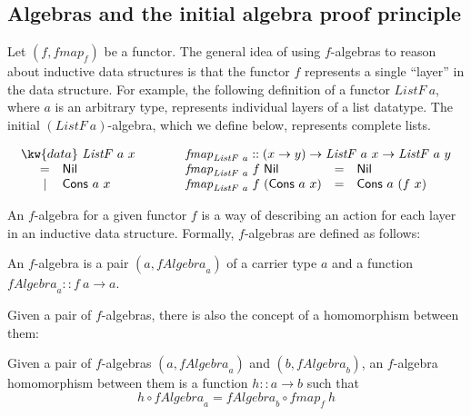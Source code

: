 \subsection{Algebras and the initial algebra proof principle}
\label{sec:f-algebras-detail}

Let $(f, \mathit{fmap}_f)$ be a functor. The general idea of using
$f$-algebras to reason about inductive data structures is that the
functor $f$ represents a single ``layer'' in the data structure. For
example, the following definition of a functor $\mathit{ListF}~a$,
where $a$ is an arbitrary type, represents individual layers of a list
datatype. The initial $(\mathit{ListF}~a)$-algebra, which we define
below, represents complete lists.

\begin{displaymath}
  \begin{array}{l@{\hspace{3em}}l}
    \begin{array}{l}
      \kw{data}~\mathit{ListF}~a~x \\
      \quad
      \begin{array}{cl}
        = & \mathsf{Nil} \\
        | & \mathsf{Cons}~a~x
      \end{array}
    \end{array}
    &
    \begin{array}{l}
      \mathit{fmap}_{\mathit{ListF}~a} :: (x \to y) \to \mathit{ListF}~a~x \to \mathit{ListF}~a~y \\
      \begin{array}{@{}l@{\hspace{0.3em}}l@{\hspace{0.3em}}lcl}
      \mathit{fmap}_{\mathit{ListF}~a}&f&\mathsf{Nil} &=& \mathsf{Nil} \\
      \mathit{fmap}_{\mathit{ListF}~a}&f&(\mathsf{Cons}~a~x) &=& \mathsf{Cons}~a~(f~x)
    \end{array}
    \end{array}
  \end{array}
\end{displaymath}

An $f$-algebra for a given functor $f$ is a way of describing an
action for each layer in an inductive data structure. Formally,
$f$-algebras are defined as follows:
\begin{definition}
  An $f$-algebra is a pair $(a, \mathit{fAlgebra}_a)$ of a carrier
  type $a$ and a function $\mathit{fAlgebra}_a :: f~a \to a$.
\end{definition}
Given a pair of $f$-algebras, there is also the concept of a
homomorphism between them:
\begin{definition}
  Given a pair of $f$-algebras $(a,\mathit{fAlgebra}_a)$ and $(b,
  \mathit{fAlgebra}_b)$, an $f$-algebra homomorphism between them is a
  function $h :: a \to b$ such that
  \begin{equation}
    \label{eq:falgebra-homomorphism}
    h \circ \mathit{fAlgebra}_a = \mathit{fAlgebra}_b \circ \mathit{fmap}_f~h
  \end{equation}
\end{definition}

